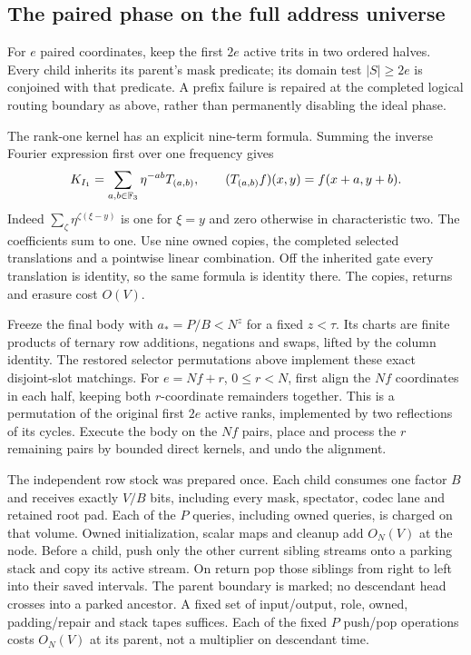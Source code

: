 \subsection{The paired phase on the full address universe}
For $e$ paired coordinates, keep the first $2e$ active trits in
two ordered halves. Every child inherits its parent's mask predicate;
its domain test $|S|\ge2e$ is conjoined with that predicate. A
prefix failure is repaired at the completed logical routing boundary
as above, rather than permanently disabling the ideal phase.

The rank-one kernel has an explicit nine-term formula. Summing the
inverse Fourier expression first over one frequency gives
\[
 K_{I_1}=\sum_{a,b\in\mathbb F_3}\eta^{-ab}T_{(a,b)},\qquad
 (T_{(a,b)}f)(x,y)=f(x+a,y+b).
\]
Indeed $\sum_{\zeta}\eta^{\zeta(\xi-y)}$ is one for $\xi=y$ and
zero otherwise in characteristic two. The coefficients sum to one.
Use nine owned copies, the completed selected translations and a
pointwise linear combination. Off the inherited gate every
translation is identity, so the same formula is identity there.
The copies, returns and erasure cost $O(V)$.

Freeze the final body with $a_*=P/B<N^z$ for a fixed $z<\tau$.
Its charts are finite products of ternary row additions, negations
and swaps, lifted by the column identity. The restored selector
permutations above implement these exact disjoint-slot matchings.
For $e=Nf+r$, $0\le r<N$, first align the $Nf$ coordinates in
each half, keeping both $r$-coordinate remainders together. This is
a permutation of the original first $2e$ active ranks, implemented
by two reflections of its cycles. Execute the body on the $Nf$
pairs, place and process the $r$ remaining pairs by bounded direct
kernels, and undo the alignment.

The independent row stock was prepared once. Each child consumes
one factor $B$ and receives exactly $V/B$ bits, including every
mask, spectator, codec lane and retained root pad. Each of the $P$
queries, including owned queries, is charged on that volume. Owned
initialization, scalar maps and cleanup add $O_N(V)$ at the node.
Before a child, push only the other current sibling streams onto a
parking stack and copy its active stream. On return pop those
siblings from right to left into their saved intervals. The parent
boundary is marked; no descendant head crosses into a parked
ancestor. A fixed set of input/output, role, owned, padding/repair
and stack tapes suffices. Each of the fixed $P$ push/pop operations
costs $O_N(V)$ at its parent, not a multiplier on descendant time.

